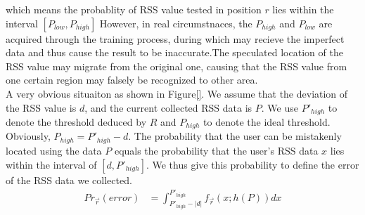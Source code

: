\documentclass[10pt,conference,compsocconf,letterpaper]{IEEEtran}
\begin{document}
which means the probablity of RSS value tested in position $r$ lies within the interval $[P_{low},P_{high}]$
However, in real circumstnaces, the $P_{high}$ and $P_{low}$ are acquired through the training process, during which may recieve the imperfect data and thus cause the result to be inaccurate.The speculated location of the RSS value may migrate from the original one, causing that the RSS value from one certain region may falsely be recognized to other area. \\
 A very obvious situaiton as shown in Figure\ref{}. We assume that the deviation of the RSS value is $d$, and the current collected RSS data is $P$. We use $P'_{high}$ to denote the threshold deduced by $R$ and $P_{high}$ to denote the ideal threshold. Obviously, $P_{high}=P'_{high}-d$. The probability that the user can be mistakenly located using the data $P$ equals the probability that the user's RSS data $x$ lies within the interval of $[d,P'_{high}]$. We thus give this probability to define the error of the RSS data we collected.
\begin{equation}
\begin{aligned}
Pr_{\vec r}(error) &=\int_{P'_{high}-|d|}^{P'_{high}}f_{\vec r}(x;h(P))dx
\end{aligned}
\end{equation}
\end{document}
